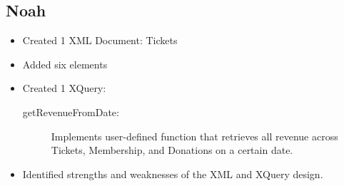 \documentclass{article} %
\begin{document}
\subsection{Noah}
\begin{itemize}
    \item Created 1 XML Document: Tickets
    \item Added six elements 
    \item Created 1 XQuery: 
    \begin{description}
        \item[getRevenueFromDate:] Implements user-defined function that retrieves all revenue across Tickets, Membership, and Donations on a certain date.
    \end{description}
    \item Identified strengths and weaknesses of the XML and XQuery design.
\end{itemize}
\end{document}

